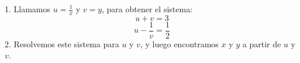 \documentclass[addpoints,spanish, 12pt,a4paper]{exam}
\renewcommand*\half{.5}
\begin{document}
\begin{questions}






\begin{solution}
1. Llamamos \(u = \frac{1}{x}\) y \(v = y\), para obtener el sistema:
   \[
   u + v = 3
   \]
   \[
   u - \frac{1}{v} = \frac{1}{2}
   \]
2. Resolvemos este sistema para \(u\) y \(v\), y luego encontramos \(x\) y \(y\) a partir de \(u\) y \(v\).
\end{solution}





\end{questions}
\end{document}
